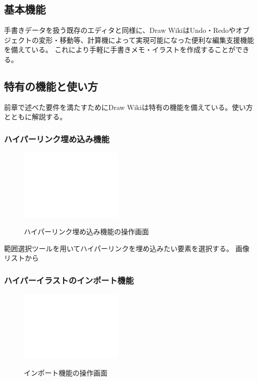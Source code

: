 \subsection{基本機能}
手書きデータを扱う既存のエディタと同様に、Draw WikiはUndo・Redoやオブジェクトの変形・移動等、計算機によって実現可能になった便利な編集支援機能を備えている。
これにより手軽に手書きメモ・イラストを作成することができる。

\subsection{特有の機能と使い方}
前章で述べた要件を満たすためにDraw Wikiは特有の機能を備えている。使い方とともに解説する。

\subsubsection{ハイパーリンク埋め込み機能}

\begin{figure}[htbp]
    \begin{center}
    {\includegraphics[width=50mm]{images/testimage.png}} \end{center}
    \caption{ハイパーリンク埋め込み機能の操作画面}
    \label{hyperlinking}
\end{figure}

範囲選択ツールを用いてハイパーリンクを埋め込みたい要素を選択する。
画像リストから

\subsubsection{ハイパーイラストのインポート機能}

\begin{figure}[htbp]
    \begin{center}
    {\includegraphics[width=50mm]{images/testimage.png}} \end{center}
    \caption{インポート機能の操作画面}
    \label{importing}
\end{figure}


